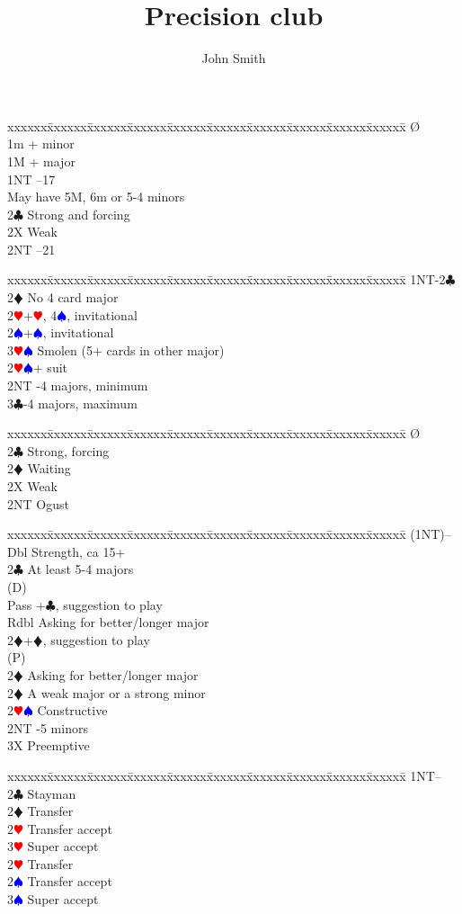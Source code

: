 \documentclass[a4paper]{article}
\title{Precision club}
\author{John Smith}
\newcommand{\BC}{\textcolor{OliveGreen}{$\clubsuit$}}
\newcommand{\BD}{\textcolor{RedOrange}{$\vardiamondsuit$}}
\newcommand{\BH}{\textcolor{Red}{$\varheartsuit${}}}
\newcommand{\BS}{\textcolor{Blue}{$\spadesuit${}}}
\newenvironment{bidtable}
{\begin{tabbing}

xxxxxx\=xxxxxx\=xxxxxx\=xxxxxx\=xxxxxx\=xxxxxx\=xxxxxx\=xxxxxx\=xxxxxx\=xxxxxx\=\kill}
{\end{tabbing} }%
\begin{document}
\maketitle
\tableofcontents

\begin{bidtable}
\O\+\\
1m + minor\\
1M + major\\
1NT --17\\
\>May have 5M, 6m or 5-4 minors\\
2\BC \> Strong and forcing\\
2X \> Weak\\
2NT --21\-
\end{bidtable}
\bigbreak
\begin{bidtable}
1NT-2\BC\+\\
2\BD \> No 4 card major\+\\
2\BH {}+\BH , 4\BS , invitational\\
2\BS {}+\BS , invitational\\
3\BH\BS \> Smolen (5+ cards in other major)\-\\
2\BH\BS {}+ suit\\
2NT -4 majors, minimum\\
3\BC {}-4 majors, maximum\-
\end{bidtable}
\bigbreak
\begin{bidtable}
\O\+\\
2\BC \> Strong, forcing\+\\
2\BD \> Waiting\-\\
2X \> Weak\+\\
2NT \> Ogust\-\-
\end{bidtable}
\bigbreak
\begin{bidtable}
(1NT)--\+\\
Dbl \> Strength, ca 15+\\
2\BC \> At least 5-4 majors\+\\
(D)\+\\
Pass +\BC , suggestion to play\\
Rdbl \> Asking for better/longer major\\
2\BD {}+\BD , suggestion to play\-\\
(P)\+\\
2\BD \> Asking for better/longer major\-\-\\
2\BD \> A weak major or a strong minor\\
2\BH\BS \> Constructive\\
2NT -5 minors\\
3X \> Preemptive\-
\end{bidtable}
\bigbreak
\begin{bidtable}
1NT--\+\\
2\BC \> Stayman\\
2\BD \> Transfer\+\\
2\BH \> Transfer accept\\
3\BH \> Super accept\-\\
2\BH \> Transfer\+\\
2\BS \> Transfer accept\\
3\BS \> Super accept\-\-
\end{bidtable}
\bigbreak
\end{document}
